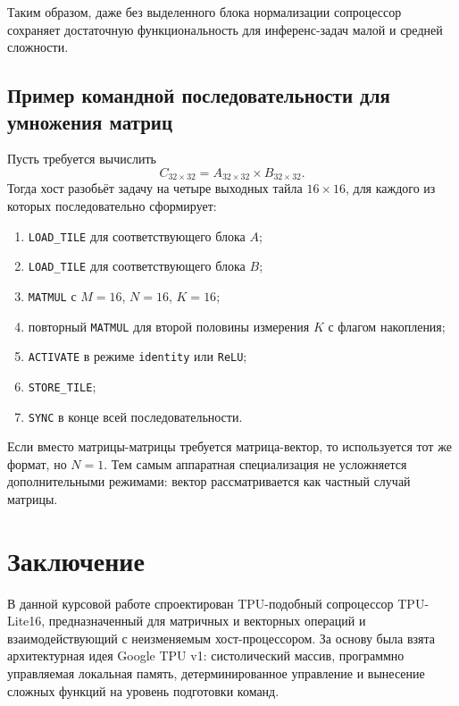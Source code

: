 \documentclass[12pt,a4paper]{article}
\begin{document}
Таким образом, даже без выделенного блока нормализации сопроцессор сохраняет достаточную функциональность для инференс-задач малой и средней сложности.

\subsection{Пример командной последовательности для умножения матриц}

Пусть требуется вычислить
\[
C_{32 \times 32} = A_{32 \times 32} \times B_{32 \times 32}.
\]
Тогда хост разобьёт задачу на четыре выходных тайла \(16 \times 16\), для каждого из которых последовательно сформирует:
\begin{enumerate}
    \item \texttt{LOAD\_TILE} для соответствующего блока \(A\);
    \item \texttt{LOAD\_TILE} для соответствующего блока \(B\);
    \item \texttt{MATMUL} с \(M=16\), \(N=16\), \(K=16\);
    \item повторный \texttt{MATMUL} для второй половины измерения \(K\) с флагом накопления;
    \item \texttt{ACTIVATE} в режиме \texttt{identity} или \texttt{ReLU};
    \item \texttt{STORE\_TILE};
    \item \texttt{SYNC} в конце всей последовательности.
\end{enumerate}

Если вместо матрицы-матрицы требуется матрица-вектор, то используется тот же формат, но \(N=1\). Тем самым аппаратная специализация не усложняется дополнительными режимами: вектор рассматривается как частный случай матрицы.

\section*{Заключение}

В данной курсовой работе спроектирован TPU-подобный сопроцессор TPU-Lite16, предназначенный для матричных и векторных операций и взаимодействующий с неизменяемым хост-процессором. За основу была взята архитектурная идея Google TPU v1: систолический массив, программно управляемая локальная память, детерминированное управление и вынесение сложных функций на уровень подготовки команд.
\end{document}
